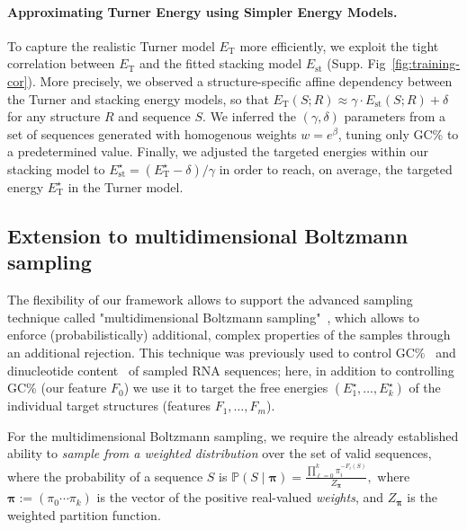 \documentclass[twocolumn]{bmcart}%
\newcommand{\val}{\bar S} %
\newcommand{\partfun}[1]{Z_{#1}}
\newcommand{\F}{\mathcal{F}}
\newcommand{\Def}[1]{\emph{#1}}
\newcommand{\TargetE}{E^{\star}}
\newcommand{\Nuc}[1]{{\sf #1}}
\newcommand{\Cb}{\Nuc{C}}
\newcommand{\Gb}{\Nuc{G}}
\newcommand{\GCb}{\Gb\Cb}
\newcommand{\EnergyTurner}{E_{\text{T}}}
\newcommand{\EnergyStacking}{E_{\text{st}}}
\newcommand{\citep}[1]{\cite{#1}}
\begin{document}
\paragraph{Approximating Turner Energy using Simpler Energy Models.}
To capture the realistic Turner model $\EnergyTurner$ more efficiently, we exploit the tight correlation between
$\EnergyTurner$ and the fitted stacking model $\EnergyStacking$
(Supp. Fig~\ref{fig:training-cor}). More precisely, we observed a
structure-specific affine dependency between the Turner and stacking
energy models, so that
$\EnergyTurner(S;R) \approx \gamma\cdot \EnergyStacking(S;R) + \delta$
for any structure $R$ and sequence $S$. We inferred the
$(\gamma,\delta)$ parameters from a set of sequences generated with
homogenous weights $w=e^{\beta}$, tuning only \GCb\% to a
predetermined value.  Finally, we adjusted the targeted energies
within our stacking model to
$\EnergyStacking^{\star} = (\EnergyTurner^{\star}- \delta)/\gamma$ in
order to reach, on average, the targeted energy
$\EnergyTurner^{\star}$ in the Turner model.


\subsection*{Extension to multidimensional Boltzmann sampling}\label{sec:multiBoltzmann}
The flexibility of our framework allows to support the advanced sampling technique called "multidimensional Boltzmann sampling"~\citep{Bodini2010}, which allows to enforce (probabilistically)  additional, complex properties of the samples through an additional rejection.
This technique was previously used to control \GCb\%~\citep{Waldispuehl2011,Reinharz2013} and dinucleotide content~\citep{Zhang2013} of sampled RNA sequences; here, in addition to controlling \GCb\% (our feature $F_0$) we use it to target the free energies $(\TargetE_1,\ldots,\TargetE_k)$ of the individual target structures (features $F_1,\dots,F_m$).

For the multidimensional Boltzmann sampling, we require the already established ability to \Def{sample from a weighted distribution} over the set of valid sequences, where the probability of a sequence $S$ is
$\mathbb{P}(S\mid \pmb{\pi}) = \frac{\prod_{\ell=0}^{k} \pi_i^{-F_i(S)}}{\partfun{\pmb{\pi}}},$
where $\pmb{\pi}:=(\pi_0\cdots\pi_k)$ is the vector of the positive real-valued \Def{weights}, and $\partfun{\pmb{\pi}}$ is the weighted partition function.

\end{document}
